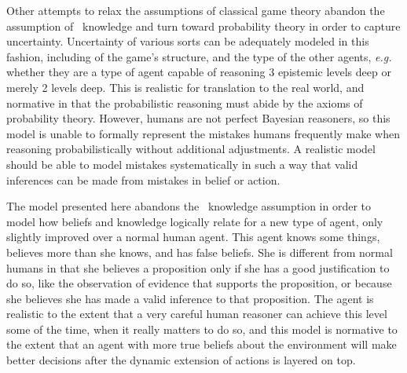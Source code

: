 

Other attempts to relax the assumptions of classical game theory abandon the assumption of \SFive\ knowledge and turn toward probability theory in order to capture uncertainty. Uncertainty of various sorts can be adequately modeled in this fashion, including of the game's structure, and the type of the other agents, \emph{e.g.} whether they are a type of agent capable of reasoning 3 epistemic levels deep or merely 2 levels deep. This is realistic for translation to the real world, and normative in that the probabilistic reasoning must abide by the axioms of probability theory. However, humans are not perfect Bayesian reasoners, so this model is unable to formally represent the mistakes humans frequently make when reasoning probabilistically without additional adjustments. A realistic model should be able to model mistakes systematically in such a way that valid inferences can be made from mistakes in belief or action.

The model presented here abandons the \SFive\ knowledge assumption in order to model how beliefs and knowledge logically relate for a new type of agent, only slightly improved over a normal human agent. This agent knows some things, believes more than she knows, and has false beliefs. She is different from normal humans in that she believes a proposition only if she has a good justification to do so, like the observation of evidence that supports the proposition, or because she believes she has made a valid inference to that proposition. The agent is realistic to the extent that a very careful human reasoner can achieve this level some of the time, when it really matters to do so, and this model is normative to the extent that an agent with more true beliefs about the environment will make better decisions after the dynamic extension of actions is layered on top. 

